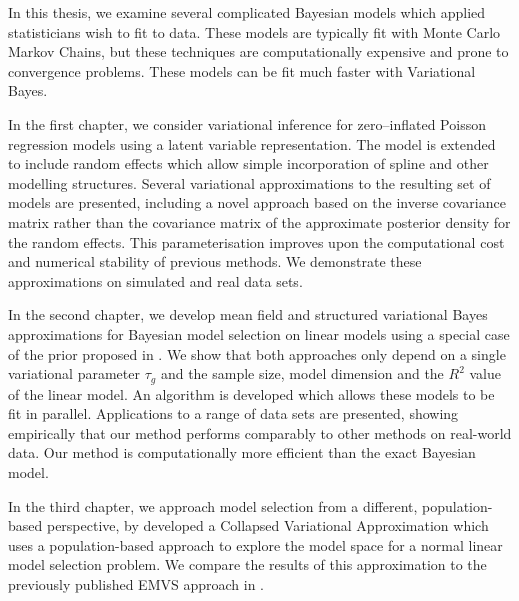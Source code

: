 In this thesis, we examine several complicated Bayesian models which applied statisticians wish to fit
to data. These models are typically fit with Monte Carlo Markov Chains, but these techniques are
computationally expensive and prone to convergence problems. These models can be fit much faster with Variational 
Bayes.

In the first chapter, we consider variational inference for zero--inflated Poisson regression models using a
latent   variable representation. The model is extended to include random effects which allow simple
incorporation of   spline and other modelling structures. Several variational approximations to the resulting
set of models are   presented, including a novel approach based on the inverse covariance matrix rather than
the covariance matrix   of the approximate posterior density for the random effects. This parameterisation
improves upon the   computational cost and numerical stability of previous methods. We demonstrate these
approximations on   simulated and real data sets.

In the second chapter, we develop mean field and structured variational Bayes approximations for Bayesian
model selection on linear models using a special case of the prior proposed in \cite{Maruyama2011}. We show
that both approaches only depend on a single variational parameter $\tau_g$ and the sample size, model
dimension and the $R^2$ value of the linear model. An algorithm is developed which allows these models to be
fit in parallel. Applications to a range of data sets are presented, showing  empirically that our method
performs comparably to other methods on real-world data. Our method is computationally more efficient  than
the exact Bayesian model.

In the third chapter, we approach model selection from a different, population-based perspective, by developed
a Collapsed Variational Approximation which uses a population-based approach to explore the model space for
a normal linear model selection problem. We compare the results of this approximation to the 
previously published EMVS approach in \cite{Rockova2014}.